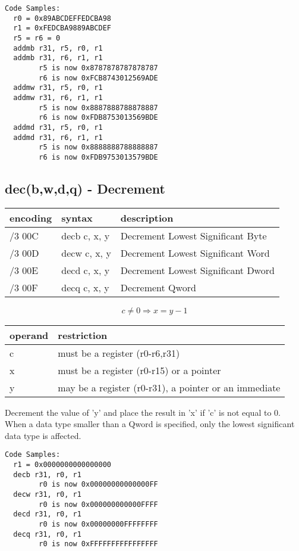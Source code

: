 \documentclass[letterpaper,10pt,openright,twoside,onecolumn]{book}
\begin{document}
  \begin{verbatim}
Code Samples:
  r0 = 0x89ABCDEFFEDCBA98
  r1 = 0xFEDCBA9889ABCDEF
  r5 = r6 = 0
  addmb r31, r5, r0, r1
  addmb r31, r6, r1, r1
        r5 is now 0x8787878787878787
        r6 is now 0xFCB8743012569ADE
  addmw r31, r5, r0, r1
  addmw r31, r6, r1, r1
        r5 is now 0x8887888788878887
        r6 is now 0xFDB8753013569BDE
  addmd r31, r5, r0, r1
  addmd r31, r6, r1, r1
        r5 is now 0x8888888788888887
        r6 is now 0xFDB9753013579BDE
  \end{verbatim}
\newpage\subsection{dec(b,w,d,q) - Decrement}
  \begin{tabular}{|l|l|l|}
   \hline
    encoding & syntax & description \\
   \hline
    /3 00C & decb c, x, y & Decrement Lowest Significant Byte \\
    /3 00D & decw c, x, y & Decrement Lowest Significant Word \\
    /3 00E & decd c, x, y & Decrement Lowest Significant Dword \\
    /3 00F & decq c, x, y & Decrement Qword \\
   \hline
  \end{tabular}

  \begin{displaymath} c \neq 0 \Rightarrow x = y - 1\end{displaymath}

  \flushleft
  \begin{tabular}{|l|l|}
   \hline
    operand & restriction \\
   \hline
    c & must be a register (r0-r6,r31) \\
    x & must be a register (r0-r15) or a pointer \\
    y & may be a register (r0-r31), a pointer or an immediate \\
   \hline
  \end{tabular}

  Decrement the value of 'y' and place the result in 'x' if 'c' is
  not equal to 0.
  When a data type smaller than a Qword is specified, only the
  lowest significant data type is affected.

  \begin{verbatim}
Code Samples:
  r1 = 0x0000000000000000
  decb r31, r0, r1
        r0 is now 0x00000000000000FF
  decw r31, r0, r1
        r0 is now 0x000000000000FFFF
  decd r31, r0, r1
        r0 is now 0x00000000FFFFFFFF
  decq r31, r0, r1
        r0 is now 0xFFFFFFFFFFFFFFFF
  \end{verbatim}
\end{document}
